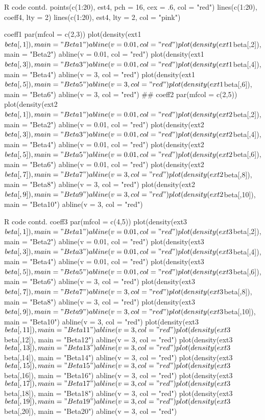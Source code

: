 \documentclass{article}
\begin{document}
\begin{sexylisting}{R code contd.}
points(c(1:20), est4, pch = 16, cex = .6, col = "red")
lines(c(1:20), coeff4, lty = 2)
lines(c(1:20), est4, lty = 2, col = "pink")

coeff1
par(mfcol = c(2,3))
plot(density(ext1$beta[,1]), main = "Beta1")
abline(v = 0.01, col = "red")
plot(density(ext1$beta[,2]), main = "Beta2")
abline(v = 0.01, col = "red")
plot(density(ext1$beta[,3]), main = "Beta3")
abline(v = 0.01, col = "red")
plot(density(ext1$beta[,4]), main = "Beta4")
abline(v = 3, col = "red")
plot(density(ext1$beta[,5]), main = "Beta5")
abline(v = 3, col = "red")
plot(density(ext1$beta[,6]), main = "Beta6")
abline(v = 3, col = "red")
##
coeff2
par(mfcol = c(2,5))
plot(density(ext2$beta[,1]), main = "Beta1")
abline(v = 0.01, col = "red")
plot(density(ext2$beta[,2]), main = "Beta2")
abline(v = 0.01, col = "red")
plot(density(ext2$beta[,3]), main = "Beta3")
abline(v = 0.01, col = "red")
plot(density(ext2$beta[,4]), main = "Beta4")
abline(v = 0.01, col = "red")
plot(density(ext2$beta[,5]), main = "Beta5")
abline(v = 0.01, col = "red")
plot(density(ext2$beta[,6]), main = "Beta6")
abline(v = 0.01, col = "red")
plot(density(ext2$beta[,7]), main = "Beta7")
abline(v = 3, col = "red")
plot(density(ext2$beta[,8]), main = "Beta8")
abline(v = 3, col = "red")
plot(density(ext2$beta[,9]), main = "Beta9")
abline(v = 3, col = "red")
plot(density(ext2$beta[,10]), main = "Beta10")
abline(v = 3, col = "red")
\end{sexylisting}
\begin{sexylisting}{R code contd.}
coeff3
par(mfcol = c(4,5))
plot(density(ext3$beta[,1]), main = "Beta1")
abline(v = 0.01, col = "red")
plot(density(ext3$beta[,2]), main = "Beta2")
abline(v = 0.01, col = "red")
plot(density(ext3$beta[,3]), main = "Beta3")
abline(v = 0.01, col = "red")
plot(density(ext3$beta[,4]), main = "Beta4")
abline(v = 0.01, col = "red")
plot(density(ext3$beta[,5]), main = "Beta5")
abline(v = 0.01, col = "red")
plot(density(ext3$beta[,6]), main = "Beta6")
abline(v = 3, col = "red")
plot(density(ext3$beta[,7]), main = "Beta7")
abline(v = 3, col = "red")
plot(density(ext3$beta[,8]), main = "Beta8")
abline(v = 3, col = "red")
plot(density(ext3$beta[,9]), main = "Beta9")
abline(v = 3, col = "red")
plot(density(ext3$beta[,10]), main = "Beta10")
abline(v = 3, col = "red")
plot(density(ext3$beta[,11]), main = "Beta11")
abline(v = 3, col = "red")
plot(density(ext3$beta[,12]), main = "Beta12")
abline(v = 3, col = "red")
plot(density(ext3$beta[,13]), main = "Beta13")
abline(v = 3, col = "red")
plot(density(ext3$beta[,14]), main = "Beta14")
abline(v = 3, col = "red")
plot(density(ext3$beta[,15]), main = "Beta15")
abline(v = 3, col = "red")
plot(density(ext3$beta[,16]), main = "Beta16")
abline(v = 3, col = "red")
plot(density(ext3$beta[,17]), main = "Beta17")
abline(v = 3, col = "red")
plot(density(ext3$beta[,18]), main = "Beta18")
abline(v = 3, col = "red")
plot(density(ext3$beta[,19]), main = "Beta19")
abline(v = 3, col = "red")
plot(density(ext3$beta[,20]), main = "Beta20")
abline(v = 3, col = "red")
\end{sexylisting}
\end{document}
